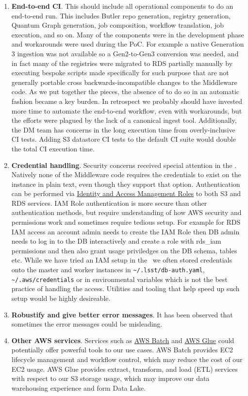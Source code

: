 \begin{enumerate}
\item \textbf{End-to-end CI}.
This should include all operational components to do an end-to-end run.
This includes Butler repo generation, registry generation, Quantum Graph generation, job composition, workflow translation, job execution, and so on.
Many of the components were in the development phase and workarounds were used during the PoC.
For example a native Generation 3 ingestion was not available so a Gen2-to-Gen3 conversion was needed, and in fact many of the registries were migrated to RDS partially manually by executing bespoke scripts made specifically for such purpose that are not generally portable cross backwards-incompatible changes to the Middleware code.
As we put together the pieces, the absence of to do so in an automatic fashion became a key burden.
In retrospect we probably should have invested more time to automate the end-to-end workflow, even with workarounds, but the efforts were plagued by the lack of a canonical ingest tool. Additionally, the DM team has concerns in the long execution time from overly-inclusive CI tests. Adding S3 datastore CI tests to the default CI suite would double the total CI execution time.
\item \textbf{Credential handling}.
Security concerns received special attention in the \poc. Natively none of the Middleware code requires the credentials to exist on the instance in plain text, even though they support that option. Authentication can be performed via \href{https://docs.aws.amazon.com/IAM/latest/UserGuide/id_roles.html}{Identity and Access Management Roles} to both S3 and RDS services. IAM Role authentication is more secure than other authentication methods, but require understanding of how AWS security and permissions work and sometimes require tedious setup. For example for RDS IAM access an account admin needs to create the IAM Role then DB admin needs to log in to the DB interactively and create a role with rds\_iam permissions and then also grant usage priviledges on the DB schema, tables etc. While we have tried an IAM setup in the \poc~we often stored credentials onto the master and worker instances in \texttt{\~{}/.lsst/db-auth.yaml}, \texttt{\~{}/.aws/credentials} or in environmental variables which is not the best practice of handling the access. Utilities and tooling that help speed up such setup would be highly desireable. 
\item \textbf{Robustify and give better error messages}.
It has been observed that sometimes the error messages could be misleading.
\item \textbf{Other AWS services}.
Services such as \href{https://aws.amazon.com/batch/}{AWS Batch} and \href{https://aws.amazon.com/glue/}{AWS Glue} could potentially offer powerful tools to our use cases.
AWS Batch provides EC2 lifecycle management and workflow control, which may reduce the cost of our EC2 usage.
AWS Glue provides extract, transform, and load (ETL) services with respect to our S3 storage usage, which may improve our data warehousing experience and form Data Lake.

\end{enumerate}

